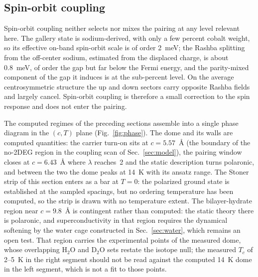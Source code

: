 \documentclass[aps,10pt,preprint,superscriptaddress,floatfix]{revtex4-2}
\begin{document}
\subsection{Spin-orbit coupling}

Spin-orbit coupling neither selects nor mixes the pairing at any level relevant here. The gallery
state is sodium-derived, with only a few percent cobalt weight, so its effective on-band spin-orbit
scale is of order 2~meV; the Rashba splitting from the off-center sodium, estimated from the
displaced charge, is about 0.8~meV, of order the gap but far below the Fermi energy, and the
parity-mixed component of the gap it induces is at the sub-percent level. On the average
centrosymmetric structure the up and down sectors carry opposite Rashba fields and largely cancel.
Spin-orbit coupling is therefore a small correction to the spin response and does not enter the
pairing.

The computed regimes of the preceding sections assemble into a single phase diagram in the
$(c,T)$ plane (Fig.~\ref{fig:phase}). The dome and its walls are computed quantities: the carrier
turn-on sits at $c=5.57$~\AA{} (the boundary of the no-2DEG region in the coupling scan of
Sec.~\ref{sec:model}), the pairing window closes at $c=6.43$~\AA{} where $\lambda$ reaches~2 and
the static description turns polaronic, and between the two the dome peaks at 14~K with its
ansatz range. The Stoner strip of this section enters as a bar at $T=0$: the polarized ground
state is established at the sampled spacings, but no ordering temperature has been computed, so
the strip is drawn with no temperature extent. The bilayer-hydrate region near $c=9.8$~\AA{} is
contingent rather than computed: the static theory there is polaronic, and superconductivity in
that region requires the dynamical softening by the water cage constructed in
Sec.~\ref{sec:water}, which remains an open test. That region carries the experimental points of
the measured dome, whose overlapping H$_2$O and D$_2$O sets restate the isotope null; the
measured $T_c$ of 2--5~K in the right segment should not be read against the computed 14~K dome
in the left segment, which is not a fit to those points.
\end{document}
